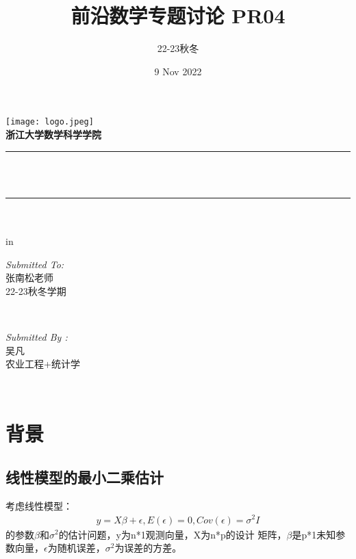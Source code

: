 \documentclass[12pt]{article}
\title{ 前沿数学专题讨论 PR04}								%
\author{22-23秋冬}								%
\date{9 Nov 2022}	%
\makeatletter
\let\thetitle\@title
\let\thedate\@date
\makeatother
\begin{document}

\begin{titlepage}
	\centering
    \vspace*{0.5 cm}
    \texttt{[image: logo.jpeg]}\\[1.0 cm]	%
	\textsc{\Large \textbf{浙江大学数学科学学院} }\\[0.5 cm]				%
	\rule{\linewidth}{0.2 mm} \\[0.4 cm]
	{ \huge \bfseries \thetitle}\\
	\rule{\linewidth}{0.2 mm} \\[1.5 cm]
	{  \bfseries \thedate}\\
	 in
	\begin{minipage}{0.4\textwidth}
		\begin{flushleft} \large
			\emph{Submitted To:}\\
			张南松老师\\
                22-23秋冬学期\\
			\end{flushleft}
			\end{minipage}~
			\begin{minipage}{0.4\textwidth}
            
			\begin{flushright} \large
			\emph{Submitted By :} \\
			吴凡\\
            农业工程+统计学\\
		\end{flushright}
        
	\end{minipage}\\[2 cm]		    
	
\end{titlepage}

\tableofcontents
\pagebreak


\section{背景}
\subsection{线性模型的最小二乘估计}
考虑线性模型：
\begin{align}
	y=X\beta+\epsilon, E(\epsilon)=0, Cov(\epsilon)= \sigma^2I
\end{align}
的参数$\beta$和$\sigma^2$的估计问题，y为n*1观测向量，X为n*p的设计
矩阵，$\beta$是p*1未知参数向量，$\epsilon$为随机误差，$\sigma^2$为误差的方差。
\end{document}
